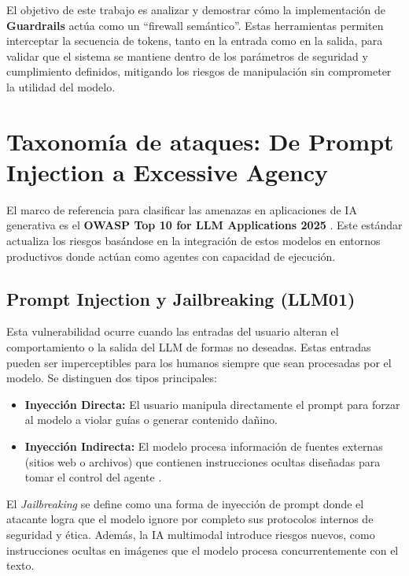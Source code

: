 \documentclass[12pt]{article}
\begin{document}
El objetivo de este trabajo es analizar y demostrar cómo la implementación de \textbf{Guardrails} actúa como un ``firewall semántico''. Estas herramientas permiten interceptar la secuencia de tokens, tanto en la entrada como en la salida, para validar que el sistema se mantiene dentro de los parámetros de seguridad y cumplimiento definidos, mitigando los riesgos de manipulación sin comprometer la utilidad del modelo.

\section{Taxonomía de ataques: De Prompt Injection a Excessive Agency}

El marco de referencia para clasificar las amenazas en aplicaciones de IA generativa es el \textbf{OWASP Top 10 for LLM Applications 2025} \parencite{owasp2025llm}. Este estándar actualiza los riesgos basándose en la integración de estos modelos en entornos productivos donde actúan como agentes con capacidad de ejecución.

\subsection{Prompt Injection y Jailbreaking (LLM01)}
Esta vulnerabilidad ocurre cuando las entradas del usuario alteran el comportamiento o la salida del LLM de formas no deseadas. Estas entradas pueden ser imperceptibles para los humanos siempre que sean procesadas por el modelo. Se distinguen dos tipos principales:
\begin{itemize}
    \item \textbf{Inyección Directa:} El usuario manipula directamente el prompt para forzar al modelo a violar guías o generar contenido dañino.
    \item \textbf{Inyección Indirecta:} El modelo procesa información de fuentes externas (sitios web o archivos) que contienen instrucciones ocultas diseñadas para tomar el control del agente \parencite{greshake2023indirect}.
\end{itemize}
El \textit{Jailbreaking} se define como una forma de inyección de prompt donde el atacante logra que el modelo ignore por completo sus protocolos internos de seguridad y ética. Además, la IA multimodal introduce riesgos nuevos, como instrucciones ocultas en imágenes que el modelo procesa concurrentemente con el texto.
\end{document}
